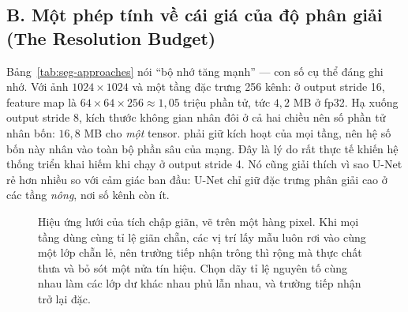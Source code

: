 \documentclass[../../../deep_learning.tex]{subfiles}
\begin{document}
\subsection{B. Một phép tính về cái giá của độ phân giải (The Resolution Budget)}
Bảng~\ref{tab:seg-approaches} nói ``bộ nhớ tăng mạnh'' --- con số cụ thể đáng ghi nhớ. Với ảnh \(1024\times1024\) và một tầng đặc trưng 256 kênh: ở output stride 16, feature map là \(64\times64\times256 \approx 1{,}05\) triệu phần tử, tức \(4{,}2\) MB ở fp32. Hạ xuống output stride 8, kích thước không gian nhân đôi ở cả hai chiều nên số phần tử nhân bốn: \(16{,}8\) MB cho \emph{một} tensor.  phải giữ kích hoạt của mọi tầng, nên hệ số bốn này nhân vào toàn bộ phần sâu của mạng. Đây là lý do rất thực tế khiến hệ thống triển khai hiếm khi chạy ở output stride 4. Nó cũng giải thích vì sao U-Net rẻ hơn nhiều so với cảm giác ban đầu: U-Net chỉ giữ đặc trưng phân giải cao ở các tầng \emph{nông}, nơi số kênh còn ít.

\begin{figure}[H]\centering
{}
\caption{Hiệu ứng lưới của tích chập giãn, vẽ trên một hàng pixel. Khi mọi tầng dùng cùng tỉ lệ giãn chẵn, các vị trí lấy mẫu luôn rơi vào cùng một lớp chẵn lẻ, nên trường tiếp nhận trông thì rộng mà thực chất thưa và bỏ sót một nửa tín hiệu. Chọn dãy tỉ lệ nguyên tố cùng nhau làm các lớp dư khác nhau phủ lẫn nhau, và trường tiếp nhận trở lại đặc.}
\label{fig:gridding}
\end{figure}
\end{document}
